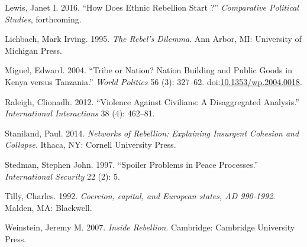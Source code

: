 \documentclass[12pt,]{book}
\theoremstyle{definition}
\theoremstyle{definition}
\theoremstyle{remark}
\begin{document}
\hypertarget{ref-Lewis2016}{}
Lewis, Janet I. 2016. ``How Does Ethnic Rebellion Start ?''
\emph{Comparative Political Studies}, forthcoming.

\hypertarget{ref-Lichbach1995}{}
Lichbach, Mark Irving. 1995. \emph{The Rebel's Dilemma}. Ann Arbor, MI:
University of Michigan Press.

\hypertarget{ref-Miguel2004b}{}
Miguel, Edward. 2004. ``Tribe or Nation? Nation Building and Public
Goods in Kenya versus Tanzania.'' \emph{World Politics} 56 (3): 327--62.
doi:\href{https://doi.org/10.1353/wp.2004.0018}{10.1353/wp.2004.0018}.

\hypertarget{ref-Raleigh2012a}{}
Raleigh, Clionadh. 2012. ``Violence Against Civilians: A Disaggregated
Analysis.'' \emph{International Interactions} 38 (4): 462--81.

\hypertarget{ref-Staniland2014}{}
Staniland, Paul. 2014. \emph{Networks of Rebellion: Explaining Insurgent
Cohesion and Collapse}. Ithaca, NY: Cornell University Press.

\hypertarget{ref-Stedman1997}{}
Stedman, Stephen John. 1997. ``Spoiler Problems in Peace Processes.''
\emph{International Security} 22 (2): 5.

\hypertarget{ref-Tilly1992}{}
Tilly, Charles. 1992. \emph{Coercion, capital, and European states, AD
990-1992}. Malden, MA: Blackwell.

\hypertarget{ref-Weinstein2007}{}
Weinstein, Jeremy M. 2007. \emph{Inside Rebellion}. Cambridge: Cambridge
University Press.
\end{document}
